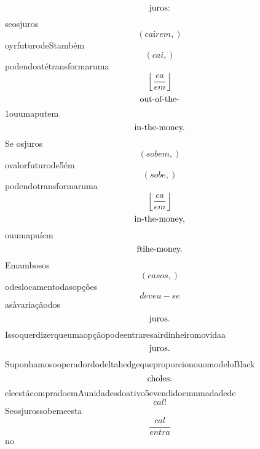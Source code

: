 \documentclass{article}
\begin{document}
\begin{equation}
$juros:$
\end{equation}seosjuros\begin{equation}
\left( caírem,\right)
\end{equation}oyrfuturodeStambém\begin{equation}
\left( cai,\right)
\end{equation}podendoatétransformaruma\begin{equation}
\left\lfloor{\frac{ca}{em}}\right\rfloor
\end{equation}\begin{equation}
$out-of-the-$
\end{equation}1ouumaputem\begin{equation}
$in-the-money.$
\end{equation}Se osjuros\begin{equation}
\left( sobem,\right)
\end{equation}ovalorfuturode5ém\begin{equation}
\left( sobe,\right)
\end{equation}podendotransformaruma\begin{equation}
\left\lfloor{\frac{ca}{em}}\right\rfloor
\end{equation}\begin{equation}
$in-the-money,$
\end{equation}ouumapuíem\begin{equation}
$ftihe-money.$
\end{equation}Emambosos\begin{equation}
\left( casos,\right)
\end{equation}odeslocamentodasopções\begin{equation}
deveu - se
\end{equation}asàvariaçãodos\begin{equation}
$juros.$
\end{equation}Issoquerdizerqueumaopçãopodeentraresairdinheiromovidaa\begin{equation}
$juros.$
\end{equation}SuponhamosooperadordodeltahedgequeproporcionouomodeloBlack\begin{equation}
$choles:$
\end{equation}eleestácompradoemAunidadesdoativo5evendidoemumadadede\begin{equation}
cal!
\end{equation}Seosjurossobemeesta\begin{equation}
\frac{cal}{entra}
\end{equation}no\begin{equation}

\end{equation}
\end{document}
